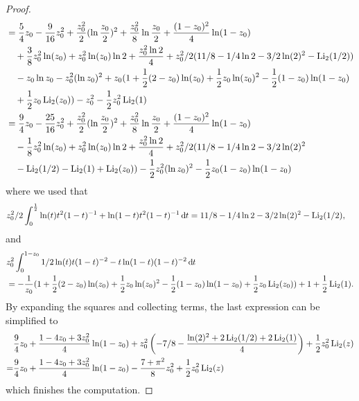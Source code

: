 \begin{proof}
\begin{align*}
	&=\frac{5}{4}z_0-\frac{9}{16}z_0^2 +\frac{z_0^2}{2}(\ln\frac{z_0}{2})^2+\frac{z_0^2}{8}\ln\frac{z_0}{2} 
		+\frac{(1-z_0)^2}{4}\ln(1-z_0) \\
	&\hspace{10pt}+\frac{3}{8}z_0^2\ln(z_0)+z_0^2\ln(z_0)\ln 2+\frac{z_0^2 \ln2}{4}
		+z_0^2/2(11/8 -1/4 \ln 2 -3/2\ln(2)^2 -  \operatorname{Li}_2(1/2)) \\
	&\hspace{10pt}-z_0 \ln z_0-z_0^2(\ln z_0)^2+z_0(1 + \frac{1}{2}(2-z_0) \ln(z_0) 
		+ \frac{1}{2}z_0 \ln(z_0)^2 - \frac{1}{2} (1-z_0) \ln(1-z_0) \\
	&\hspace{10pt}+\frac{1}{2}z_0 \operatorname{Li}_2(z_0)) - z_0^2   -\frac{1}{2}  z_0^2\operatorname{Li}_2(1) \\
	&=\frac{9}{4}z_0-\frac{25}{16}z_0^2 +\frac{z_0^2}{2}(\ln\frac{z_0}{2})^2+\frac{z_0^2}{8}\ln\frac{z_0}{2} 
		+\frac{(1-z_0)^2}{4}\ln(1-z_0) \\
	&\hspace{10pt}-\frac{1}{8}z_0^2\ln(z_0)+z_0^2\ln(z_0)\ln 2+\frac{z_0^2 \ln2}{4}
		+z_0^2/2(11/8 -1/4 \ln 2 -3/2\ln(2)^2 \\
	&\hspace{10pt}- \operatorname{Li}_2(1/2)-\operatorname{Li}_2(1)+\operatorname{Li}_2(z_0)) -\frac{1}{2}z_0^2(\ln z_0)^2 - \frac{1}{2} z_0(1-z_0) \ln(1-z_0)
\end{align*}
where we used that
\begin{align*}
	z_0^2/2\int_0^{\frac{1}{2}} \ln(t)t^2(1-t)^{-1}+\ln(1-t)t^2(1-t)^{-1} \operatorname{\mathrm{d}\hspace{-2pt}} t
	&= 11/8 -1/4 \ln 2 -3/2\ln(2)^2 -  \operatorname{Li}_2(1/2),
\end{align*}
and
\begin{align*}
	&z_0^2\int_0^{1-z_0} 1/2\ln(t)t(1-t)^{-2}-t\ln(1-t)(1-t)^{-2} \operatorname{\mathrm{d}\hspace{-2pt}} t\\
	&= -\frac{1}{z_0} (1 + \frac{1}{2}(2-z_0) \ln(z_0) + \frac{1}{2}z_0 \ln(z_0)^2 - \frac{1}{2} (1-z_0) \ln(1-z_0) +\frac{1}{2}z_0 \operatorname{Li}_2(z_0))+1   +\frac{1}{2}  \operatorname{Li}_2(1).
\end{align*}
By expanding the squares and collecting terms, the last expression can be simplified to
\begin{align*}
&\frac{9}{4} z_0 + \frac{1 - 4 z_0 + 3 z_0^2}{4}\ln(1 - z_0) + 
z_0^2 \left(-7/8 - \frac{\ln(2)^2+2\operatorname{Li}_2(1/2) + 2\operatorname{Li}_2(1)}{4} \right) + 
\frac{1}{2}z_0^2 \operatorname{Li}_2(z) \\
=&\frac{9}{4} z_0 + \frac{1 - 4 z_0 + 3 z_0^2}{4}\ln(1 - z_0) - \frac{7+\pi^2}{8}
z_0^2  + 
\frac{1}{2}z_0^2 \operatorname{Li}_2(z)
\end{align*}
which finishes the computation.
\end{proof}



